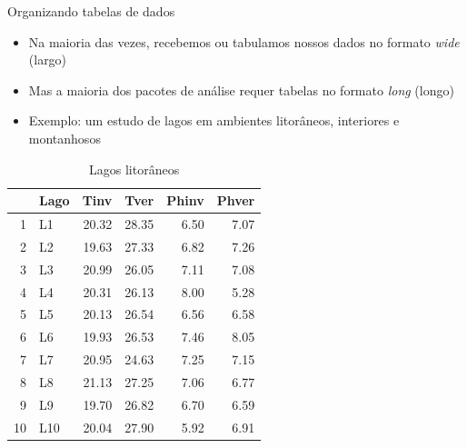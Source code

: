 \documentclass{beamer}\usepackage[]{graphicx}\usepackage[]{color}
\begin{document}
\begin{frame}[fragile]{Organizando tabelas de dados}

\begin{Small}
\begin{itemize}
  \item Na maioria das vezes, recebemos ou tabulamos nossos dados no formato \emph{wide} (largo)
  \item Mas a maioria dos pacotes de análise requer tabelas no formato \emph{long} (longo) 
  \item Exemplo: um estudo de lagos em ambientes litorâneos, interiores e montanhosos
\end{itemize}




\begin{tiny}
\begin{table}[ht]
\centering
\begin{tabular}{rlrrrr}
  \hline
 & Lago & Tinv & Tver & Phinv & Phver \\ 
  \hline
1 & L1 & 20.32 & 28.35 & 6.50 & 7.07 \\ 
  2 & L2 & 19.63 & 27.33 & 6.82 & 7.26 \\ 
  3 & L3 & 20.99 & 26.05 & 7.11 & 7.08 \\ 
  4 & L4 & 20.31 & 26.13 & 8.00 & 5.28 \\ 
  5 & L5 & 20.13 & 26.54 & 6.56 & 6.58 \\ 
  6 & L6 & 19.93 & 26.53 & 7.46 & 8.05 \\ 
  7 & L7 & 20.95 & 24.63 & 7.25 & 7.15 \\ 
  8 & L8 & 21.13 & 27.25 & 7.06 & 6.77 \\ 
  9 & L9 & 19.70 & 26.82 & 6.70 & 6.59 \\ 
  10 & L10 & 20.04 & 27.90 & 5.92 & 6.91 \\ 
   \hline
\end{tabular}
\caption{Lagos litorâneos} 
\end{table}

\end{tiny}


\end{Small}
\end{frame}
\end{document}
